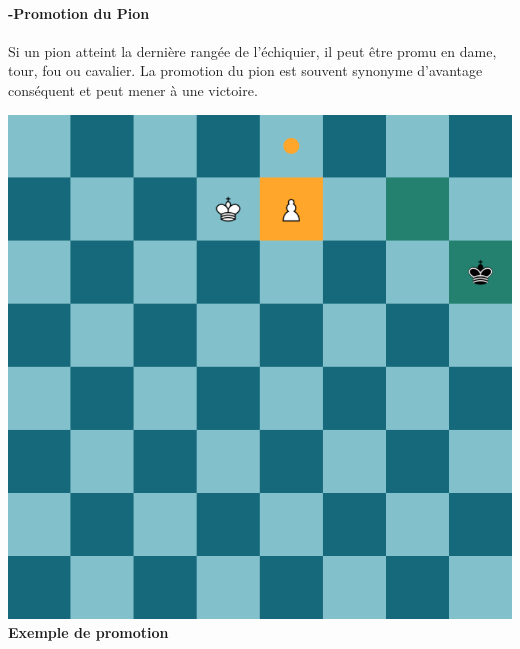 \documentclass{article}
\begin{document}
\paragraph{-Promotion du Pion} Si un pion atteint la dernière rangée de l'échiquier, il peut être promu en dame,
 tour, fou ou cavalier. La promotion du pion est souvent synonyme d'avantage conséquent et peut mener à une victoire.

 \noindent
 \begin{minipage}{0.48\textwidth}
     \centering
     \includegraphics[width=\textwidth, height=\textwidth]{promotion1.png}
     \vspace{0.5cm}
    \textbf{Exemple de promotion}
 \end{minipage}
 \hfill
\end{document}

